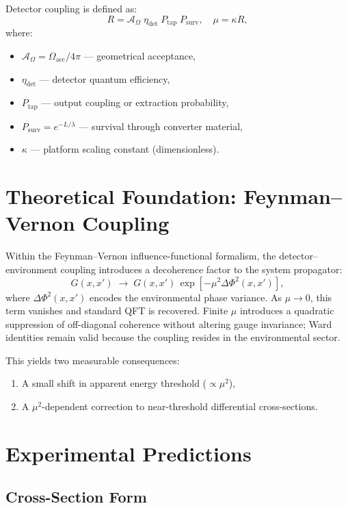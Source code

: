 \documentclass[12pt]{article}
\begin{document}
Detector coupling is defined as:
\[
R = 
\mathcal{A}_\Omega
\;\eta_{\text{det}}\;
P_{\text{tap}}\;
P_{\text{surv}},
\quad
\mu = \kappa R,
\]
where:
\begin{itemize}[noitemsep]
  \item $\mathcal{A}_\Omega = \Omega_{\text{acc}} / 4\pi$ — geometrical acceptance,
  \item $\eta_{\text{det}}$ — detector quantum efficiency,
  \item $P_{\text{tap}}$ — output coupling or extraction probability,
  \item $P_{\text{surv}} = e^{-L/\lambda}$ — survival through converter material,
  \item $\kappa$ — platform scaling constant (dimensionless).
\end{itemize}

\section{Theoretical Foundation: Feynman--Vernon Coupling}

Within the Feynman--Vernon influence-functional formalism, the detector--environment coupling introduces a decoherence factor to the system propagator:
\[
G(x,x') \;\longrightarrow\;
G(x,x')\, \exp[-\mu^2 \Delta\Phi^2(x,x')],
\]
where $\Delta\Phi^2(x,x')$ encodes the environmental phase variance.  
As $\mu \to 0$, this term vanishes and standard QFT is recovered.  
Finite $\mu$ introduces a quadratic suppression of off-diagonal coherence without altering gauge invariance; Ward identities remain valid because the coupling resides in the environmental sector.

This yields two measurable consequences:
\begin{enumerate}[noitemsep]
  \item A small shift in apparent energy threshold ($\propto \mu^2$),
  \item A $\mu^2$-dependent correction to near-threshold differential cross-sections.
\end{enumerate}

\section{Experimental Predictions}

\subsection*{Cross-Section Form}
\end{document}
